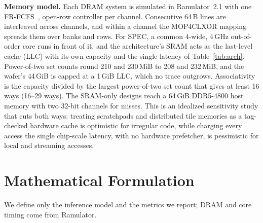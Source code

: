 \documentclass[conference]{IEEEtran}
\begin{document}
\textbf{Memory model.} Each DRAM system is simulated in Ramulator~2.1 with one FR-FCFS~\cite{rixner2000}, open-row controller per channel. Consecutive 64\,B lines are interleaved across channels, and within a channel the MOP4CLXOR mapping spreads them over banks and rows. For SPEC, a common 4-wide, 4\,GHz out-of-order core runs in front of it, and the architecture's SRAM acts as the last-level cache (LLC) with its own capacity and the single latency of Table~\ref{tab:arch}. Power-of-two set counts round 210 and 230\,MiB to 208 and 232\,MiB, and the wafer's 44\,GiB is capped at a 1\,GiB LLC, which no trace outgrows. Associativity is the capacity divided by the largest power-of-two set count that gives at least 16 ways (16--29 ways). The SRAM-only designs reach a 64\,GiB DDR5-4800 host memory with two 32-bit channels for misses. This is an idealized sensitivity study that cuts both ways: treating scratchpads and distributed tile memories as a tag-checked hardware cache is optimistic for irregular code, while charging every access the single chip-scale latency, with no hardware prefetcher, is pessimistic for local and streaming accesses.

\section{Mathematical Formulation}\label{sec:math}
We define only the inference model and the metrics we report; DRAM and core timing come from Ramulator.
\end{document}
